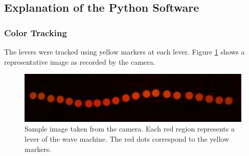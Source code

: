 \documentclass[12pt]{article}
\begin{document}
\subsection{Explanation of the Python Software}
\subsubsection{Color Tracking}
The levers were tracked using yellow markers at each lever. Figure \ref{fig:raw} shows a representative image as recorded by the camera. 

\begin{figure}[hbt]
  \includegraphics[width=.6\columnwidth]{data_analysis_sample_frame}
  \caption{Sample image taken from the camera. Each red region represents a lever of the wave machine. The red dots correspond to the yellow markers.}\label{fig:raw}
\end{figure}
\end{document}
